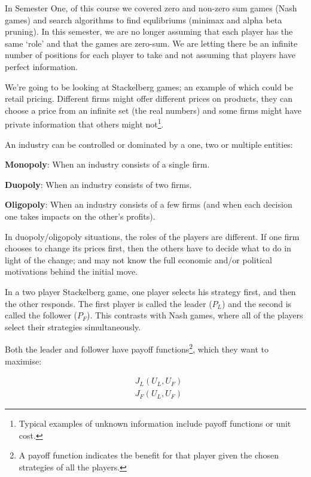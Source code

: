 
In Semester One, of this course we covered zero and non-zero sum games (Nash
games) and search algorithms to find equlibriums (minimax and alpha beta
pruning). In this semester, we are no longer assuming that each player has the
same `role' and that the games are zero-sum. We are letting there be an infinite
number of positions for each player to take and not assuming that players have
perfect information.

We're going to be looking at Stackelberg games; an example of which could be
retail pricing. Different firms might offer different prices on products, they
can choose a price from an infinite set (the real numbers) and some firms might
have private information that others might not\footnote{Typical examples of
unknown information include payoff functions or unit cost.}.

An industry can be controlled or dominated by a one, two or multiple entities:

\begin{description}
  \item \textbf{Monopoly}: When an industry consists of a single firm.
  \item \textbf{Duopoly}: When an industry consists of two firms.
  \item \textbf{Oligopoly}: When an industry consists of a few firms (and when
  each decision one takes impacts on the other's profits).
\end{description}

In duopoly/oligopoly situations, the roles of the players are different. If one
firm chooses to change its prices first, then the others have to decide what to
do in light of the change; and may not know the full economic and/or political
motivations behind the initial move.

In a two player Stackelberg game, one player selects his strategy first, and
then the other responds. The first player is called the leader ($P_L$) and the
second is called the follower ($P_F$). This contrasts with Nash games, where all
of the players select their strategies simultaneously.

Both the leader and follower have payoff functions\footnote{A payoff function
indicates the benefit for that player given the chosen strategies of all the
players.}, which they want to maximise:

\[
  \begin{split}
  &J_L(U_L, U_F)\\
  &J_F(U_L, U_F)
  \end{split}
\]

